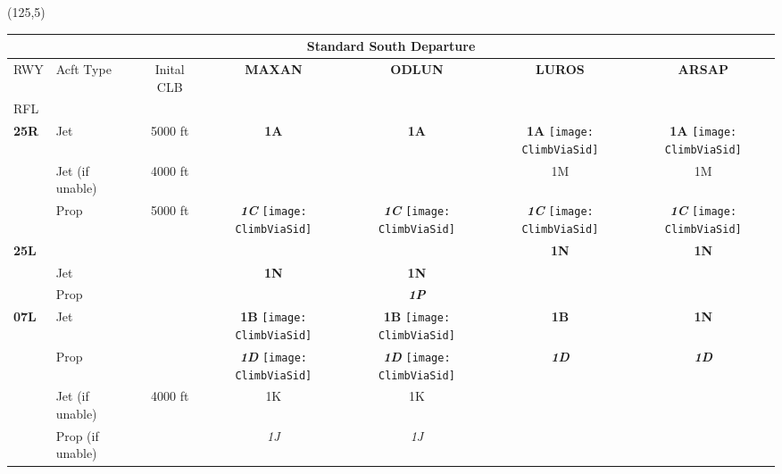 \documentclass[10pt,landscape,a4paper]{article}
\begin{document}
\begin{textblock}{30}(125,5)
\begin{table}[]
\begin{tabular}{|l|l|c|c|c|c|c|}
\multicolumn{7}{c}{\textbf{Standard South Departure}}  \\ \hline
RWY 			& Acft Type				& Inital CLB & \textbf{MAXAN} & \textbf{ODLUN} & \textbf{LUROS} & \textbf{ARSAP} \\ 
RFL 			& 						& 		& & & & \\			\hline

\textbf{25R} & Jet & 5000 ft & \textbf{1A} & \textbf{1A} & \textbf{1A} \texttt{[image: ClimbViaSid]} & \textbf{1A} \texttt{[image: ClimbViaSid]} \\ \cline{2-7}
& Jet (if unable) & 4000 ft & & & 1M & 1M \\ \cline{2-7}
& Prop & \multirow{6}{*}{5000 ft} & \textbf{\textit{1C}} \texttt{[image: ClimbViaSid]} & \textbf{\textit{1C}} \texttt{[image: ClimbViaSid]} & \textbf{\textit{1C}}  \texttt{[image: ClimbViaSid]} & \textbf{\textit{1C}} \texttt{[image: ClimbViaSid]} \\ \cline{1-2} \cline{4-7}

\textbf{25L} & & & & & \textbf{1N} & \textbf{1N} \\ \cline{2-2} \cline{4-7}
& Jet & & \textbf{1N} & \textbf{1N} & & \\ \cline{2-2} \cline{4-7}
& Prop & & & \textbf{\textit{1P}} & & \\ \cline{1-2} \cline{4-7}

\textbf{07L} & Jet &  & \textbf{1B} \texttt{[image: ClimbViaSid]} & \textbf{1B} \texttt{[image: ClimbViaSid]} & \textbf{1B} & \textbf{1N} \\ \cline{2-2} \cline{4-7}& Prop & & \textbf{\textit{1D}} \texttt{[image: ClimbViaSid]} & \textbf{\textit{1D}} \texttt{[image: ClimbViaSid]} & \textbf{\textit{1D}} & \textbf{\textit{1D}} \\ \cline{2-7}
& Jet (if unable) & \multirow{2}{*}{4000 ft} & 1K & 1K & & \\ \cline{2-2} \cline{4-7}
& Prop (if unable) & & \textit{1J} & \textit{1J} & &  \\ \hline


\end{tabular}
\end{table}
\end{textblock}
\end{document}
